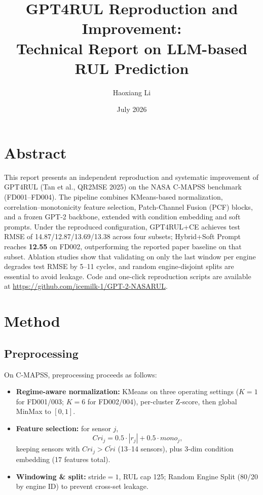 \documentclass[10pt,twocolumn]{article}
\title{\textbf{GPT4RUL Reproduction and Improvement:\\Technical Report on LLM-based RUL Prediction}}
\author{Haoxiang Li}
\date{July 2026}
\begin{document}
\maketitle

\section*{Abstract}

This report presents an independent reproduction and systematic improvement of GPT4RUL (Tan et al., QR2MSE 2025) on the NASA C-MAPSS benchmark (FD001--FD004).
The pipeline combines KMeans-based normalization, correlation--monotonicity feature selection, Patch-Channel Fusion (PCF) blocks, and a frozen GPT-2 backbone, extended with condition embedding and soft prompts.
Under the reproduced configuration, GPT4RUL+CE achieves test RMSE of 14.87/12.87/13.69/13.38 across four subsets; Hybrid+Soft Prompt reaches \textbf{12.55} on FD002, outperforming the reported paper baseline on that subset.
Ablation studies show that validating on only the last window per engine degrades test RMSE by 5--11 cycles, and random engine-disjoint splits are essential to avoid leakage.
Code and one-click reproduction scripts are available at \url{https://github.com/icemilk-1/GPT-2-NASARUL}.

\section{Method}

\subsection{Preprocessing}

On C-MAPSS, preprocessing proceeds as follows:
\begin{itemize}
  \item \textbf{Regime-aware normalization:} KMeans on three operating settings ($K{=}1$ for FD001/003; $K{=}6$ for FD002/004), per-cluster Z-score, then global MinMax to $[0,1]$.
  \item \textbf{Feature selection:} for sensor $j$,
  \begin{equation}
    Cri_j = 0.5 \cdot |r_j| + 0.5 \cdot mono_j,
  \end{equation}
  keeping sensors with $Cri_j > \bar{Cri}$ (13--14 sensors), plus 3-dim condition embedding (17 features total).
  \item \textbf{Windowing \& split:} stride${=}1$, RUL cap 125; Random Engine Split (80/20 by engine ID) to prevent cross-set leakage.
\end{itemize}
\end{document}
